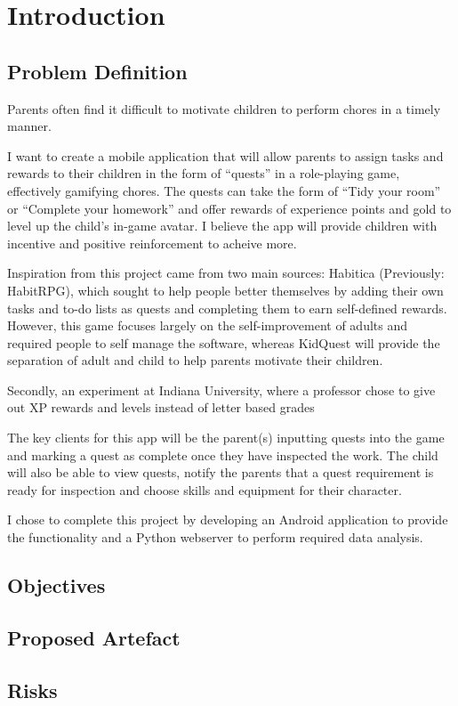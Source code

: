 
\chapter{Introduction}
\label{chap:intro}

\section{Problem Definition}
Parents often find it difficult to motivate children to perform chores in a timely manner.

I want to create a mobile application that will allow parents to assign tasks and rewards to their children in the form of ``quests'' in a role-playing game, effectively gamifying chores. 
The quests can take the form of “Tidy your room” or “Complete your homework” and offer rewards of experience points and gold to level up the child's in-game avatar. 
I believe the app will provide children with incentive and positive reinforcement to acheive more.

Inspiration from this project came from two main sources: Habitica (Previously: HabitRPG), which sought to help people better themselves by adding their own tasks and to-do lists as quests and completing them to earn self-defined rewards. 
However, this game focuses largely on the self-improvement of adults and required people to self manage the software, whereas KidQuest will provide the separation of adult and child to help parents motivate their children.

Secondly, an experiment at Indiana University, where a professor chose to give out XP rewards and levels instead of letter based grades \cite{sheldon2011multiplayer} 

The key clients for this app will be the parent(s) inputting quests into the game and marking a quest as complete once they have inspected the work. 
The child will also be able to view quests, notify the parents that a quest requirement is ready for inspection and choose skills and equipment for their character. 

I chose to complete this project by developing an Android application to provide the functionality and a Python webserver to perform required data analysis.

\section{Objectives}

\section{Proposed Artefact}

\section{Risks}

